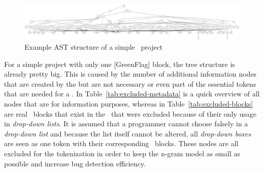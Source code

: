 \begin{figure}[hbtp]
\centering
\includegraphics[scale=0.20]{images/AST_example(3).png}
\caption{Example AST structure of a simple \scratch\ project}
\label{fig:ast}
\end{figure}

For a simple \scratch{} project with only one [GreenFlag] block, the tree structure is already pretty big. This is caused by the number of additional information nodes that are created by the \litterbox{} \AST{} but are not necessary or even part of the essential tokens that are needed for a \ngram{}. In Table~\ref{tab:excluded-metadata} is a quick overview of all  nodes that are for information purposes, whereas in Table~\ref{tab:excluded-blocks} are real \scratch\ blocks that exist in the \AST\ that were excluded because of their only usage in \textit{drop-down lists}. It is assumed that a programmer cannot choose falsely in a \textit{drop-down list} and because the list itself cannot be altered, all \textit{drop-down boxes} are seen as one token with their corresponding \scratch\ blocks. These nodes are all excluded for the tokenization in order to keep the n-gram model as small as possible and increase bug detection efficiency.   

